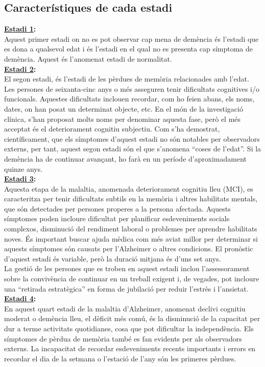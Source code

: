 \documentclass[a4paper,12pt]{report}
\begin{document}
\subsection*{Característiques de cada estadi}
\textbf{\underline{Estadi 1}:}\\
Aquest primer estadi on no es pot observar cap mena de demència és l'estadi que es dona a qualsevol edat i és l'estadi en el qual no es presenta cap símptoma de demència. Aquest és l'anomenat estadi de normalitat.\\
\textbf{\underline{Estadi 2}:}\\
El segon estadi, és l'estadi de les pèrdues de memòria relacionades amb l'edat. Les persones de seixanta-cinc anys o més asseguren tenir dificultats cognitives i/o funcionals. Aquestes dificultats inclouen recordar, com ho feien abans, els noms, dates, on han posat un determinat objecte, etc. En el món de la investigació clínica, s'han proposat molts noms per denominar aquesta fase, però el més acceptat és el deteriorament cognitiu subjectiu. Com s'ha demostrat, científicament, que els símptomes d'aquest estadi no són notables per observadors externs, per tant, aquest segon estadi són el que s'anomena “coses de l'edat”. Si la demència ha de continuar avançant, ho farà en un període d'aproximadament quinze anys.\\
\textbf{\underline{Estadi 3}:}\\
Aquesta etapa de la malaltia, anomenada deteriorament cognitiu lleu (MCI), es caracteritza per tenir dificultats subtils en la memòria i altres habilitats mentals, que són detectades per persones properes a la persona afectada. Aquests símptomes poden incloure dificultat per planificar esdeveniments socials complexos, disminució del rendiment laboral o problemes per aprendre habilitats noves. És important buscar ajuda mèdica com més aviat millor per determinar si aquests símptomes són causats per l'Alzheimer o altres condicions. El pronòstic d'aquest estadi és variable, però la duració mitjana és d'uns set anys.\\
La gestió de les persones que es troben en aquest estadi inclou l'assessorament sobre la convivència de continuar en un treball exigent i, de vegades, pot incloure una “retirada estratègica” en forma de jubilació per reduir l'estrès i l'ansietat.\\
\textbf{\underline{Estadi 4}:}\\
En aquest quart estadi de la malaltia d'Alzheimer, anomenat declivi cognitiu moderat o demència lleu, el dèficit més comú, és la disminució de la capacitat per dur a terme activitats quotidianes, cosa que pot dificultar la independència. Els símptomes de pèrdua de memòria també es fan evidents per als observadors externs. La incapacitat de recordar esdeveniments recents importants i errors en recordar el dia de la setmana o l'estació de l'any són les primeres pèrdues.\\
\end{document}
